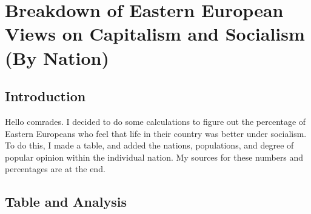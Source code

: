 \section[Eastern European Views on Capitalism and Socialism]{Breakdown of Eastern European Views on Capitalism and Socialism (By Nation)\\}
\subsection*{Introduction}

Hello comrades.
I decided to do some calculations to figure out the percentage of Eastern Europeans who feel that life in their country was better under socialism.
To do this, I made a table, and added the nations, populations, and degree of popular opinion within the individual nation.
My sources for these numbers and percentages are at the end.

\subsection*{Table and Analysis}

